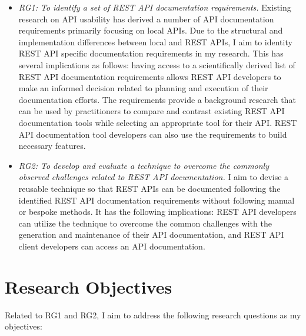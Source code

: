 \begin{itemize}
  \item \textit{RG1: To identify a set of REST API documentation requirements.} Existing research on API usability has derived a number of API documentation requirements primarily focusing on local APIs. Due to the structural and implementation differences between local and REST APIs, I aim to identity REST API specific documentation requirements in my research. This has several implications as follows: having access to a scientifically derived list of REST API documentation requirements allows REST API developers to make an informed decision related to planning and execution of their documentation efforts. The requirements provide a background research that can be used by practitioners to compare and contrast existing REST API documentation tools while selecting an appropriate tool for their API. REST API documentation tool developers can also use the requirements to build necessary features.
  \item \textit{RG2: To develop and evaluate a technique to overcome the commonly observed challenges related to REST API documentation.} I aim to devise a reusable technique so that REST APIs can be documented following the identified REST API documentation requirements without following manual or bespoke methods. It has the following implications: REST API developers can utilize the technique to overcome the common challenges with the generation and maintenance of their API documentation, and REST API client developers can access an API documentation.
\end{itemize}


\section{Research Objectives}
Related to RG1 and RG2, I aim to address the following research questions as my objectives:

